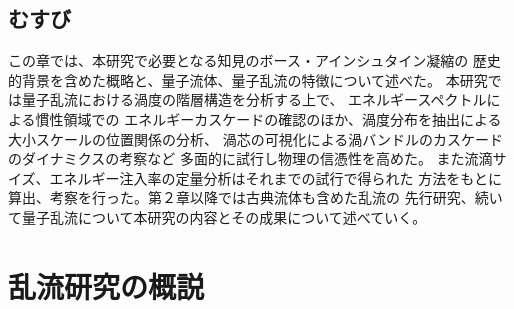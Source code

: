 \documentclass[12pt,a4paper]{jbook}
\begin{document}
		\section{むすび}
		この章では、本研究で必要となる知見のボース・アインシュタイン凝縮の
        歴史的背景を含めた概略と、量子流体、量子乱流の特徴について述べた。
		本研究では量子乱流における渦度の階層構造を分析する上で、
        エネルギースペクトルによる慣性領域での
        エネルギーカスケードの確認のほか、渦度分布を抽出による大小スケールの位置関係の分析、
        渦芯の可視化による渦バンドルのカスケードのダイナミクスの考察など
        多面的に試行し物理の信憑性を高めた。
        また流滴サイズ、エネルギー注入率の定量分析はそれまでの試行で得られた
        方法をもとに算出、考察を行った。第２章以降では古典流体も含めた乱流の
        先行研究、続いて量子乱流について本研究の内容とその成果について述べていく。


	\chapter{乱流研究の概説}
\end{document}
